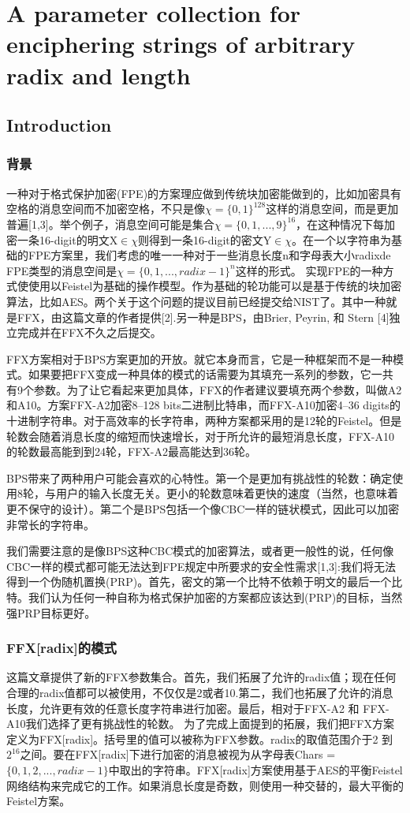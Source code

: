 
\chapter{A parameter collection for enciphering strings of arbitrary radix and length}
\section{Introduction}
\subsection{背景}
一种对于格式保护加密(FPE)的方案理应做到传统块加密能做到的，比如加密具有空格的消息空间而不加密空格，不只是像$\chi=\{0,1\}^{128}$这样的消息空间，而是更加普遍[1,3]。举个例子，消息空间可能是集合$\chi=\{0,1,...,9\}^{16}$，在这种情况下每加密一条16-digit的明文X$\in \chi$则得到一条16-digit的密文Y$\in \chi$。在一个以字符串为基础的FPE方案里，我们考虑的唯一一种对于一些消息长度n和字母表大小radixde FPE类型的消息空间是$\chi = \{0,1,...,radix-1\}^n$这样的形式。
实现FPE的一种方式使使用以Feistel为基础的操作模型。作为基础的轮功能可以是基于传统的块加密算法，比如AES。两个关于这个问题的提议目前已经提交给NIST了。其中一种就是FFX，由这篇文章的作者提供[2].另一种是BPS，由Brier, Peyrin, 和 Stern [4]独立完成并在FFX不久之后提交。

FFX方案相对于BPS方案更加的开放。就它本身而言，它是一种框架而不是一种模式。如果要把FFX变成一种具体的模式的话需要为其填充一系列的参数，它一共有9个参数。为了让它看起来更加具体，FFX的作者建议要填充两个参数，叫做A2和A10。方案FFX-A2加密8–128 bits二进制比特串，而FFX-A10加密4–36 digits的十进制字符串。对于高效率的长字符串，两种方案都采用的是12轮的Feistel。但是轮数会随着消息长度的缩短而快速增长，对于所允许的最短消息长度，FFX-A10的轮数最高能到到24轮，FFX-A2最高能达到36轮。

BPS带来了两种用户可能会喜欢的心特性。第一个是更加有挑战性的轮数：确定使用8轮，与用户的输入长度无关。更小的轮数意味着更快的速度（当然，也意味着更不保守的设计）。第二个是BPS包括一个像CBC一样的链状模式，因此可以加密非常长的字符串。

我们需要注意的是像BPS这种CBC模式的加密算法，或者更一般性的说，任何像CBC一样的模式都可能无法达到FPE规定中所要求的安全性需求[1,3]:我们将无法得到一个伪随机置换(PRP)。首先，密文的第一个比特不依赖于明文的最后一个比特。我们认为任何一种自称为格式保护加密的方案都应该达到(PRP)的目标，当然强PRP目标更好。

\subsection{FFX[radix]的模式}
这篇文章提供了新的FFX参数集合。首先，我们拓展了允许的radix值；现在任何合理的radix值都可以被使用，不仅仅是2或者10.第二，我们也拓展了允许的消息长度，允许更有效的任意长度字符串进行加密。最后，相对于FFX-A2 和 FFX-A10我们选择了更有挑战性的轮数。
为了完成上面提到的拓展，我们把FFX方案定义为FFX[radix]。括号里的值可以被称为FFX参数。radix的取值范围介于2 到 $2^{16}$之间。要在FFX[radix]下进行加密的消息被视为从字母表Chars = $\{0,1,2,...,radix-1\}$中取出的字符串。FFX[radix]方案使用基于AES的平衡Feistel网络结构来完成它的工作。如果消息长度是奇数，则使用一种交替的，最大平衡的Feistel方案。

